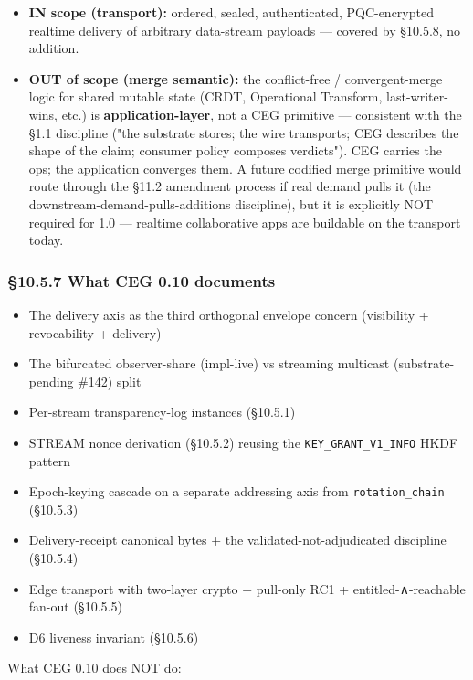 \documentclass[10pt]{article}
\begin{document}
\begin{itemize}\setlength\itemsep{0pt}
\item \textbf{IN scope (transport):} ordered, sealed, authenticated, PQC-encrypted realtime delivery of arbitrary data-stream payloads — covered by §10.5.8, no addition.
\item \textbf{OUT of scope (merge semantic):} the conflict-free / convergent-merge logic for shared mutable state (CRDT, Operational Transform, last-writer-wins, etc.) is \textbf{application-layer}, not a CEG primitive — consistent with the §1.1 discipline ("the substrate stores; the wire transports; CEG describes the shape of the claim; consumer policy composes verdicts"). CEG carries the ops; the application converges them. A future codified merge primitive would route through the §11.2 amendment process if real demand pulls it (the downstream-demand-pulls-additions discipline), but it is explicitly NOT required for 1.0 — realtime collaborative apps are buildable on the transport today.
\end{itemize}


\subsubsection*{§10.5.7 What CEG 0.10 documents}


\begin{itemize}\setlength\itemsep{0pt}
\item The delivery axis as the third orthogonal envelope concern (visibility + revocability + delivery)
\item The bifurcated observer-share (impl-live) vs streaming multicast (substrate-pending \#142) split
\item Per-stream transparency-log instances (§10.5.1)
\item STREAM nonce derivation (§10.5.2) reusing the \texttt{KEY\_GRANT\_V1\_INFO} HKDF pattern
\item Epoch-keying cascade on a separate addressing axis from \texttt{rotation\_chain} (§10.5.3)
\item Delivery-receipt canonical bytes + the validated-not-adjudicated discipline (§10.5.4)
\item Edge transport with two-layer crypto + pull-only RC1 + entitled-∧-reachable fan-out (§10.5.5)
\item D6 liveness invariant (§10.5.6)
\end{itemize}


What CEG 0.10 does NOT do:
\end{document}
